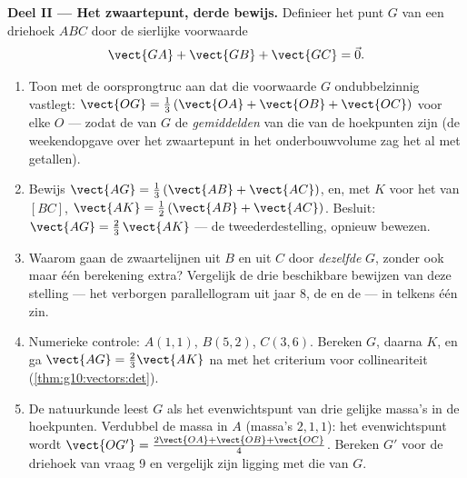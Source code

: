 \begin{problem}
\medskip
\noindent\textbf{Deel II --- Het zwaartepunt, derde bewijs.}
Definieer het punt $G$ van een driehoek $ABC$ door de sierlijke voorwaarde
\[
\vect{GA} + \vect{GB} + \vect{GC} = \vec 0 .
\]
\begin{enumerate}[resume]
  \item Toon met de oorsprongtruc aan dat die voorwaarde $G$ ondubbelzinnig
        vastlegt: $\vect{OG} = \frac13\left(\vect{OA} + \vect{OB} +
        \vect{OC}\right)$ voor elke $O$ --- zodat de  van $G$ de
        \emph{gemiddelden} van die van de hoekpunten zijn (de weekendopgave
        over het zwaartepunt in het onderbouwvolume zag het al met getallen).
  \item Bewijs $\vect{AG} = \frac13\left(\vect{AB} + \vect{AC}\right)$, en,
        met $K$ voor het  van $[BC]$, $\vect{AK} =
        \frac12\left(\vect{AB} + \vect{AC}\right)$. Besluit:
        $\vect{AG} = \frac23\,\vect{AK}$ --- de tweederdestelling, opnieuw
        bewezen.
  \item Waarom gaan de zwaartelijnen uit $B$ en uit $C$ door \emph{dezelfde}
        $G$, zonder ook maar één berekening extra? Vergelijk de drie
        beschikbare bewijzen van deze stelling --- het verborgen
        parallellogram uit jaar 8, de  en de  --- in telkens
        één zin.
  \item Numerieke controle: $A(1, 1)$, $B(5, 2)$, $C(3, 6)$. Bereken $G$,
        daarna $K$, en ga $\vect{AG} = \frac23 \vect{AK}$ na met het
        criterium voor collineariteit (\cref{thm:g10:vectors:det}).
  \item De natuurkunde leest $G$ als het evenwichtspunt van drie gelijke
        massa's in de hoekpunten. Verdubbel de massa in $A$ (massa's
        $2, 1, 1$): het evenwichtspunt wordt
        $\vect{OG'} = \frac{2\vect{OA} + \vect{OB} + \vect{OC}}{4}$. Bereken
        $G'$ voor de driehoek van vraag 9 en vergelijk zijn ligging met die
        van $G$.
\end{enumerate}


\end{problem}
